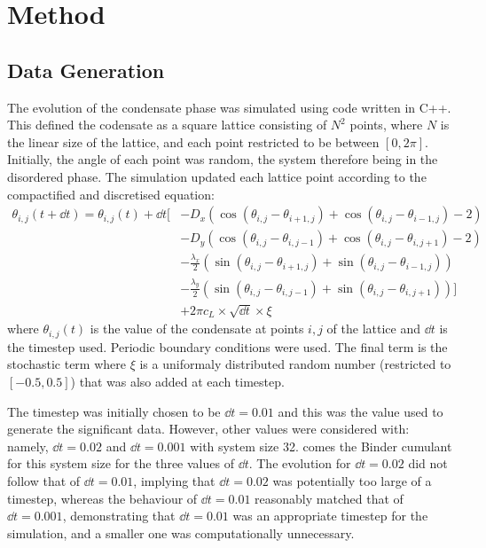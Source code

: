 \chapter{Method} 
\section{Data Generation}

The evolution of the condensate phase was simulated using code written in C++. This defined the codensate as a square lattice consisting of $N^2$ points, where $N$ is the linear size of the lattice, and each point restricted to be between $[0, 2 \pi]$. Initially, the angle of each point was random, the system therefore being in the disordered phase. The simulation updated each lattice point according to the compactified and discretised equation:
\[
\begin{split}
\theta_{i,j}(t +\dd{t}) = \theta_{i,j}(t) +  \dd{t}[&- D_x ( \cos(\theta_{i,j} - \theta_{i+1,j}) + \cos( \theta_{i,j} - \theta_{i-1,j}) - 2)\\
 					&- D_y(\cos(\theta_{i,j} - \theta_{i,j-1}) + \cos(\theta_{i,j} - \theta_{i,j+1}) - 2) \\
					& -\frac{\lambda_x}{2}(\sin(\theta_{i,j} - \theta_{i+1,j}) + \sin( \theta_{i,j} - \theta_{i-1,j}) ) \\ 
					& -\frac{\lambda_y}{2}(\sin(\theta_{i,j} - \theta_{i,j-1}) + \sin(\theta_{i,j} - \theta_{i,j+1}))] \\
					& +2\pi c_L \times \sqrt{\dd{t}} \times \xi 
\end{split}
\]
where $\theta_{i,j}(t)$ is the value of the condensate at points $i,j$ of the lattice and $\dd{t}$ is the timestep used. Periodic boundary conditions were used. The final term is the stochastic term where $\xi$ is a uniformaly distributed random number (restricted to $[-0.5, 0.5]$) that was also added at each timestep. 

The timestep was initially chosen to be $\dd{t}=0.01$ and this was the value used to generate the significant data. However, other values were considered with: namely, $\dd{t} = 0.02$ and $\dd{t} = 0.001$ with system size 32. \fig{\ref{fig:binder_different_cL}} comes the Binder cumulant for this system size for the three values of $\dd{t}$. The evolution for $\dd{t}=0.02$  did not follow that of $\dd{t}=0.01$, implying that $\dd{t}=0.02$ was potentially too large of a timestep, whereas the behaviour of $\dd{t}=0.01$ reasonably matched that of $\dd{t}=0.001$, demonstrating that $\dd{t}=0.01$ was an appropriate timestep for the simulation, and a smaller one was computationally unnecessary. 

